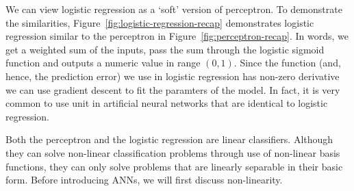 \begin{marginfigure}
  \centering
  \caption{\label{fig:logistic-regression-recap}%
    A schematic representation of logistic regression.
  }
\end{marginfigure}
We can view logistic regression as a `soft' version of perceptron.
To demonstrate the similarities,
Figure~\ref{fig:logistic-regression-recap} 
demonstrates logistic regression 
similar to the perceptron in Figure~\ref{fig:perceptron-recap}.
In words, we get a weighted sum of the inputs,
pass the sum through the logistic sigmoid function
and outputs a numeric value in range $(0, 1)$.
Since the function (and, hence, the prediction error)
we use in logistic regression has non-zero derivative 
we can use gradient descent to fit the paramters of the model.
In fact, it is very common to use unit in artificial neural networks
that are identical to logistic regression.

Both the perceptron and the logistic regression
are linear classifiers.
Although they can solve non-linear classification problems
through use of non-linear basis functions,
they can only solve problems that are linearly separable in their basic form.
Before introducing ANNs, we will first discuss non-linearity.

